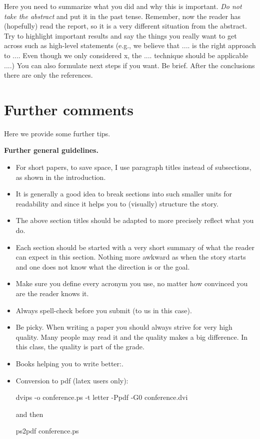 \documentclass[sigconf]{acmart}
\newcommand{\mypar}[1]{{\bf #1.}}
\begin{document}
Here you need to summarize what you did and why this is important. {\em Do not
    take the abstract} and put it in the past tense. Remember, now the reader has
(hopefully) read the report, so it is a very different situation from the
abstract. Try to highlight important results and say the things you really want
to get across such as high-level statements (e.g., we believe that .... is the
right approach to .... Even though we only considered x, the .... technique
should be applicable ....) You can also formulate next steps if you want. Be
brief. After the conclusions there are only the references.

\section{Further comments}

Here we provide some further tips.

\mypar{Further general guidelines}

\begin{itemize}
  \item For short papers, to save space, I use paragraph titles instead of subsections,
        as shown in the introduction.

  \item It is generally a good idea to break sections into such smaller units for
        readability and since it helps you to (visually) structure the story.

  \item The above section titles should be adapted to more precisely reflect what you
        do.

  \item Each section should be started with a very short summary of what the reader can
        expect in this section. Nothing more awkward as when the story starts and one
        does not know what the direction is or the goal.

  \item Make sure you define every acronym you use, no matter how convinced you are the
        reader knows it.

  \item Always spell-check before you submit (to us in this case).

  \item Be picky. When writing a paper you should always strive for very high quality.
        Many people may read it and the quality makes a big difference. In this class,
        the quality is part of the grade.

  \item Books helping you to write better:.

  \item Conversion to pdf (latex users only):

        dvips -o conference.ps -t letter -Ppdf -G0 conference.dvi

        and then

        ps2pdf conference.ps
\end{itemize}
\end{document}
